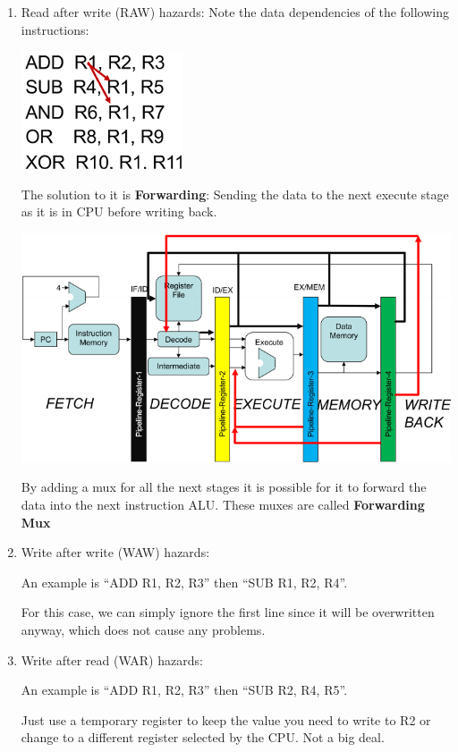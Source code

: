 \documentclass[letterpaper,12pt]{article}
\begin{document}
\begin{enumerate}
    \item Read after write (RAW) hazards:
          Note the data dependencies of the following instructions:

          \includegraphics*[scale = 0.7]{./Image/RAW instructions.png}

          The solution to it is \textbf{Forwarding}: Sending the data to the next execute stage as it is in CPU before writing back.

          \includegraphics*[scale = 0.8]{./Image/Forwarding.png}

          By adding a mux for all the next stages it is possible for it to forward the data into the next instruction ALU. These muxes are called \textbf{Forwarding Mux}

    \item Write after write (WAW) hazards:

          An example is ``ADD R1, R2, R3'' then ``SUB R1, R2, R4''.

          For this case, we can simply ignore the first line since it will be overwritten anyway, which does not cause any problems.
    \item Write after read (WAR) hazards:

          An example is ``ADD R1, R2, R3'' then ``SUB R2, R4, R5''.

          Just use a temporary register to keep the value you need to write to R2 or change to a different register selected by the CPU. Not a big deal.
\end{enumerate}
\end{document}
